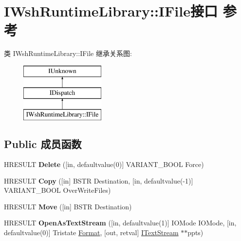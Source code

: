 \hypertarget{interface_i_wsh_runtime_library_1_1_i_file}{}\section{I\+Wsh\+Runtime\+Library\+:\+:I\+File接口 参考}
\label{interface_i_wsh_runtime_library_1_1_i_file}
类 I\+Wsh\+Runtime\+Library\+:\+:I\+File 继承关系图\+:\begin{figure}[H]
\begin{center}
\leavevmode
\includegraphics[height=3.000000cm]{interface_i_wsh_runtime_library_1_1_i_file}
\end{center}
\end{figure}
\subsection*{Public 成员函数}
\begin{DoxyCompactItemize}
\item 
\mbox{\label{interface_i_wsh_runtime_library_1_1_i_file_ab1233e4541f238b4c2480af040d3f364}} 
H\+R\+E\+S\+U\+LT {\bfseries Delete} (\mbox{[}in, defaultvalue(0)\mbox{]} V\+A\+R\+I\+A\+N\+T\+\_\+\+B\+O\+OL Force)
\item 
\mbox{\label{interface_i_wsh_runtime_library_1_1_i_file_a02b1b07681280b12f297d6948dd0389e}} 
H\+R\+E\+S\+U\+LT {\bfseries Copy} (\mbox{[}in\mbox{]} B\+S\+TR Destination, \mbox{[}in, defaultvalue(-\/1)\mbox{]} V\+A\+R\+I\+A\+N\+T\+\_\+\+B\+O\+OL Over\+Write\+Files)
\item 
\mbox{\label{interface_i_wsh_runtime_library_1_1_i_file_a9ad58968bad037313363bda01d56891a}} 
H\+R\+E\+S\+U\+LT {\bfseries Move} (\mbox{[}in\mbox{]} B\+S\+TR Destination)
\item 
\mbox{\label{interface_i_wsh_runtime_library_1_1_i_file_a1643901787e865aad7af2360047cda61}} 
H\+R\+E\+S\+U\+LT {\bfseries Open\+As\+Text\+Stream} (\mbox{[}in, defaultvalue(1)\mbox{]} I\+O\+Mode I\+O\+Mode, \mbox{[}in, defaultvalue(0)\mbox{]} Tristate \hyperlink{struct_format}{Format}, \mbox{[}out, retval\mbox{]} \hyperlink{interface_i_wsh_runtime_library_1_1_i_text_stream}{I\+Text\+Stream} $\ast$$\ast$ppts)
\end{DoxyCompactItemize}
